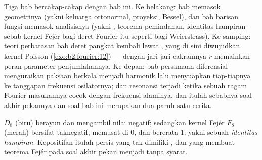\begin{remark}
Tiga bab bercakap-cakap dengan bab ini. Ke belakang: bab
 memasok geometrinya (yakni keluarga ortonormal,
proyeksi, Bessel), dan bab barisan fungsi memasok
analisisnya (yakni , teorema pemindahan, identitas
hampiran --- sebab kernel Fejér bagi deret Fourier itu seperti
 bagi Weierstrass). Ke samping:
teori perbatasan bab deret pangkat kembali lewat , yang di sini diwujudkan kernel Poisson
(\cref{exo:b2:fourier:12}) --- dengan jari-jari cakramnya $r$ memainkan
peran parameter penjumlahannya. Ke depan: bab
persamaan diferensial menguraikan paksaan berkala
menjadi harmonik lalu menyuapkan tiap-tiapnya ke tanggapan frekuensi
osilatornya; dan resonansi terjadi ketika sebuah ragam Fourier masukannya
cocok dengan frekuensi alaminya, dan itulah sebabnya soal akhir pekannya
dan soal bab ini merupakan dua paruh satu cerita.
\end{remark}

\begin{omfigure}

{\small {} $D_8$ (biru) berayun dan mengambil
nilai negatif; sedangkan kernel Fejér $F_8$ (merah) bersifat taknegatif,
memusat di $0$, dan bererata $1$: yakni sebuah \emph{identitas
hampiran}. Kepositifan itulah persis yang tak dimiliki ,
dan yang membuat teorema Fejér pada soal akhir pekan
menjadi tanpa syarat.}
\end{omfigure}

